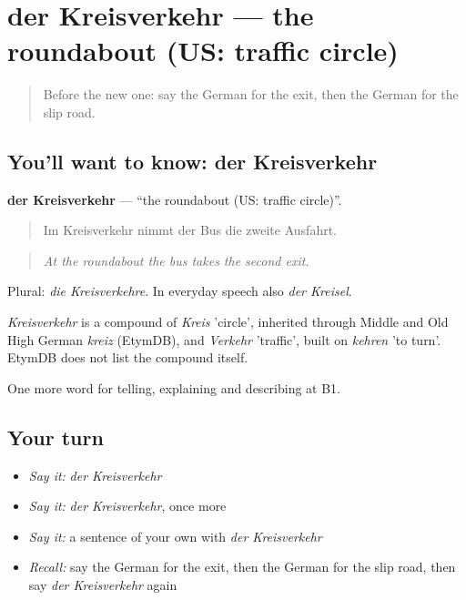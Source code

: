 \section[der Kreisverkehr]{der Kreisverkehr — the roundabout (US: traffic circle)}

\label{lesson:GE-C398-kreisverkehr}



\begin{quote}
Before the new one: say the German for the exit, then the German for the slip road.
\end{quote}

\subsection*{You'll want to know: der Kreisverkehr}
\textbf{der Kreisverkehr} — \textquotedblleft{}the roundabout (US: traffic circle)\textquotedblright{}.

\begin{quote}
Im Kreisverkehr nimmt der Bus die zweite Ausfahrt.
\end{quote}

\begin{quote}
\emph{At the roundabout the bus takes the second exit.}
\end{quote}

Plural: \emph{die Kreisverkehre}. In everyday speech also \emph{der Kreisel}.

\begin{cousinweb}
\emph{Kreisverkehr} is a compound of \emph{Kreis} 'circle', inherited through Middle and Old High German \emph{kreiz} (EtymDB), and \emph{Verkehr} 'traffic', built on \emph{kehren} 'to turn'. EtymDB does not list the compound itself.
\end{cousinweb}

\begin{grammarlens}[title={What you've built}]
One more word for telling, explaining and describing at B1.
\end{grammarlens}

\subsection*{Your turn}
\begin{itemize}
\raggedright
  \item \emph{Say it:} \emph{der Kreisverkehr}
  \item \emph{Say it:} \emph{der Kreisverkehr}, once more
  \item \emph{Say it:} a sentence of your own with \emph{der Kreisverkehr}
  \item \emph{Recall:} say the German for the exit, then the German for the slip road, then say \emph{der Kreisverkehr} again
\end{itemize}

